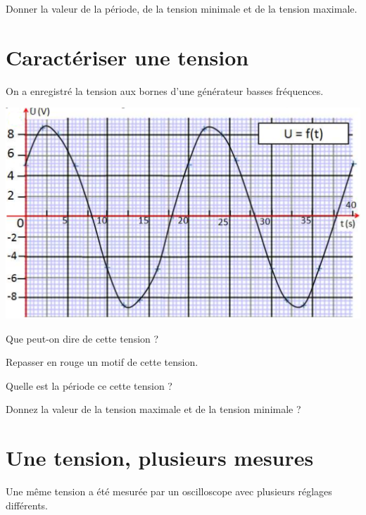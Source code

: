 \documentclass[a4paper,11pt]{exam}
\begin{document}
\begin{questions}
	\question Donner la valeur de la période, de la tension minimale et de la tension maximale.
	\fillwithdottedlines{2cm}
\end{questions}

\newpage



\section{Caractériser une tension}

On a enregistré la tension aux bornes d'une générateur basses fréquences.

\begin{center}
	\includegraphics[scale=0.5]{img/tension}
\end{center}

\begin{questions}
	\question Que peut-on dire de cette tension ?
	\fillwithdottedlines{1.5cm}
	
	\question Repasser en rouge un motif de cette tension.
	
	\question Quelle est la période ce cette tension ?
	\fillwithdottedlines{2cm}
	
	\question Donnez la valeur de la tension maximale et de la tension minimale ?
	\fillwithdottedlines{2cm}
\end{questions}

\newpage

\section{Une tension, plusieurs mesures}

Une même tension a été mesurée par un oscilloscope avec plusieurs réglages différents.
\end{document}
